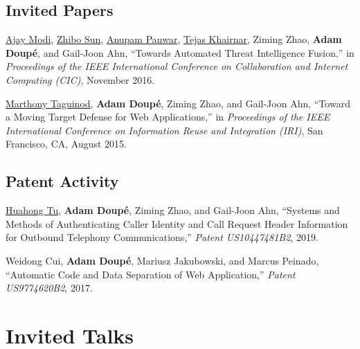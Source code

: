 \documentclass[11pt,letterpaper,sans]{moderncv}
\begin{document}
\subsection{Invited Papers}

\begin{etaremune}

\item \underline{Ajay Modi}, \underline{Zhibo Sun}, \underline{Anupam
  Panwar}, \underline{Tejas Khairnar}, Ziming Zhao, \textbf{Adam
  Doup\'e}, and Gail-Joon Ahn, ``Towards Automated Threat Intelligence
  Fusion,'' in \emph{Proceedings of the IEEE International Conference
    on Collaboration and Internet Computing (CIC)}, November 2016.

\item \underline{Marthony Taguinod}, \textbf{Adam Doup\'e}, Ziming
  Zhao, and Gail-Joon Ahn, ``Toward a Moving Target Defense for Web
  Applications,'' in \emph{Proceedings of the IEEE International
    Conference on Information Reuse and Integration (IRI)}, San
  Francisco, CA, August 2015.
\end{etaremune}

\subsection{Patent Activity}

\begin{etaremune}

  \item \underline{Huahong Tu}, \textbf{Adam Doup\'e}, Ziming Zhao,
    and Gail-Joon Ahn, ``Systems and Methods of Authenticating Caller
    Identity and Call Request Header Information for Outbound
    Telephony Communications,'' \emph{Patent US10447481B2}, 2019.

  \item Weidong Cui, \textbf{Adam Doup\'e}, Mariusz Jakubowski, and Marcus
    Peinado, ``Automatic Code and Data Separation of Web
    Application,'' \emph{Patent US9774620B2}, 2017.

\end{etaremune}

\section{Invited Talks}
\end{document}
